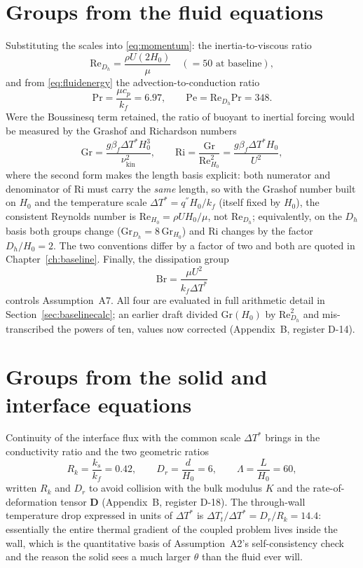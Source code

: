 \section{Groups from the fluid equations}
Substituting the scales into \eqref{eq:momentum}: the inertia-to-viscous ratio
\begin{equation}
\mathrm{Re}_{D_h}=\frac{\rho U(2H_0)}{\mu}\quad(=50\text{ at baseline}),
\end{equation}
and from \eqref{eq:fluidenergy} the advection-to-conduction ratio
\begin{equation}
\mathrm{Pr}=\frac{\mu c_p}{k_f}=6.97,\qquad \mathrm{Pe}=\mathrm{Re}_{D_h}\mathrm{Pr}=348 .
\end{equation}
Were the Boussinesq term retained, the ratio of buoyant to inertial forcing would be measured by
the Grashof and Richardson numbers
\begin{equation}
\mathrm{Gr}=\frac{g\beta_f\Delta T^*H_0^3}{\nu_{\mathrm{kin}}^2},\qquad
\mathrm{Ri}=\frac{\mathrm{Gr}}{\mathrm{Re}_{H_0}^2}
=\frac{g\beta_f\Delta T^*H_0}{U^2},
\label{eq:grri}
\end{equation}
where the second form makes the length basis explicit: both numerator and denominator of Ri must
carry the \emph{same} length, so with the Grashof number built on $H_0$ and the temperature scale
$\Delta T^*=q^{''}H_0/k_f$ (itself fixed by $H_0$), the consistent Reynolds number is
$\mathrm{Re}_{H_0}=\rho UH_0/\mu$, not $\mathrm{Re}_{D_h}$; equivalently, on the $D_h$ basis both
groups change ($\mathrm{Gr}_{D_h}=8\,\mathrm{Gr}_{H_0}$) and Ri changes by the factor
$D_h/H_0=2$. The two conventions differ by a factor of two and both are quoted in
Chapter~\ref{ch:baseline}. Finally, the dissipation group
\begin{equation}
\mathrm{Br}=\frac{\mu U^2}{k_f\Delta T^*}
\end{equation}
controls Assumption~A7. All four are evaluated in full arithmetic detail in
Section~\ref{sec:baselinecalc}; an earlier draft divided $\mathrm{Gr}(H_0)$ by
$\mathrm{Re}_{D_h}^2$ and mis-transcribed the powers of ten, values now corrected
(Appendix~B, register D-14).

\section{Groups from the solid and interface equations}
Continuity of the interface flux with the common scale $\Delta T^*$ brings in the conductivity
ratio and the two geometric ratios
\begin{equation}
R_k=\frac{k_s}{k_f}=0.42,\qquad D_r=\frac{d}{H_0}=6,\qquad \Lambda=\frac{L}{H_0}=60 ,
\end{equation}
written $R_k$ and $D_r$ to avoid collision with the bulk modulus $K$ and the rate-of-deformation
tensor $\mathbf D$ (Appendix~B, register D-18). The through-wall temperature drop expressed in
units of $\Delta T^*$ is
$\Delta T_t/\Delta T^*=D_r/R_k=14.4$: essentially the entire thermal gradient of the coupled
problem lives inside the wall, which is the quantitative basis of Assumption~A2's
self-consistency check and the reason the solid sees a much larger $\theta$ than the fluid ever
will.

